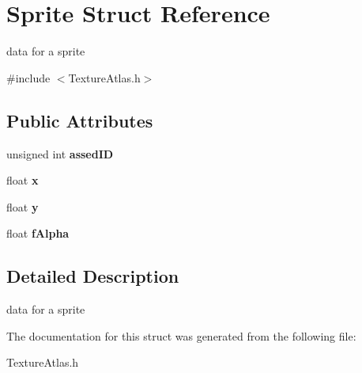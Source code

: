\hypertarget{struct_sprite}{\section{Sprite Struct Reference}
\label{struct_sprite}
}


data for a sprite  




{\ttfamily \#include $<$Texture\-Atlas.\-h$>$}

\subsection*{Public Attributes}
\begin{DoxyCompactItemize}
\item 
\hypertarget{struct_sprite_a22e1375f618ebfe6d63fb113fc63c9de}{unsigned int {\bfseries assed\-I\-D}}\label{struct_sprite_a22e1375f618ebfe6d63fb113fc63c9de}

\item 
\hypertarget{struct_sprite_ad5222d1d6d41088ab80cf7e096461799}{float {\bfseries x}}\label{struct_sprite_ad5222d1d6d41088ab80cf7e096461799}

\item 
\hypertarget{struct_sprite_ad09503279ec7c1b96bf67566a917e183}{float {\bfseries y}}\label{struct_sprite_ad09503279ec7c1b96bf67566a917e183}

\item 
\hypertarget{struct_sprite_af3b58d18e88bf5c5dff221f9acffd04d}{float {\bfseries f\-Alpha}}\label{struct_sprite_af3b58d18e88bf5c5dff221f9acffd04d}

\end{DoxyCompactItemize}


\subsection{Detailed Description}
data for a sprite 

The documentation for this struct was generated from the following file\-:\begin{DoxyCompactItemize}
\item 
Texture\-Atlas.\-h\end{DoxyCompactItemize}
